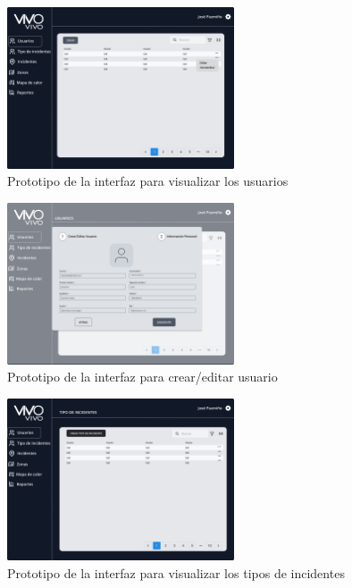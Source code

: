 \begin{figure}[H]
      \centering
      \includegraphics[width=0.6\textwidth]{chapters/III-resultados-y-discusion/resources/images/prototipo-menu-tabla-entradas-web.png}
      \caption{Prototipo de la interfaz para visualizar los usuarios}
      \label{fig:prototipo-interfaz-usuario-web-3}
\end{figure}

\begin{figure}[H]
      \centering
      \includegraphics[width=0.6\textwidth]{chapters/III-resultados-y-discusion/resources/images/prototipo-formulario-usuario-web.png}
      \caption{Prototipo de la interfaz para crear/editar usuario}
      \label{fig:prototipo-interfaz-usuario-web-4}
\end{figure}

\begin{figure}[H]
      \centering
      \includegraphics[width=0.6\textwidth]{chapters/III-resultados-y-discusion/resources/images/prototipo-tabla-tipos-incidentes-web.png}
      \caption{Prototipo de la interfaz para visualizar los tipos de incidentes}
      \label{fig:prototipo-interfaz-usuario-web-1}
\end{figure}

